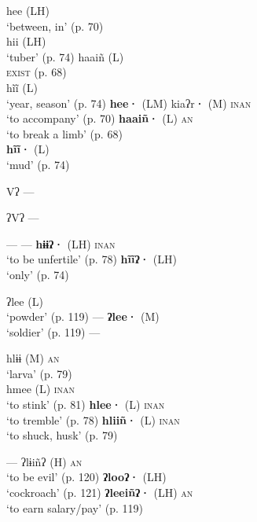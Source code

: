 \documentclass[output=paper]{langscibook}
\begin{document}
\ea
{}
     {hee (LH) \\
          \glt ‘between, in’ (p. 70)\\
     hii (LH) \\
          \glt ‘tuber’ (p. 74)
     }
     {haaiñ (L) \\
          \textsc{exist} (p. 68) \\
     hĩĩ (L) \\
          \glt ‘year, season’ (p. 74)
     }
     {\textbf{hee·} (LM) kiaʔr{\textbf{·}} (M) \textsc{inan} \\
               \glt ‘to accompany’ (p. 70)
     }
     {\textbf{haaiñ·} (L) \textsc{an}\\
               \glt ‘to break a limb’ (p. 68)\\
     \textbf{hĩĩ·} (L)\\
               \glt ‘mud’ (p. 74)\\
     }
\z

\ea Vʔ      ---
\z

\ea ʔVʔ     ---
\z

\ea
{}
     {---}
     {---}
     {\textbf{hɨɨʔ·} (LH) \textsc{inan} \\
          \glt ‘to be unfertile’ (p. 78)
     }
     {\textbf{hĩĩʔ·} (LH)\\
          \glt ‘only’ (p. 74)
     }
\z


\ea
{}
     {ʔlee (L)\\
               \glt ‘powder’ (p. 119)
     }
     {---}
     {\textbf{ʔlee·} (M)\\
          \glt ‘soldier’ (p. 119)
     }
     {---}
\z

\ea
{}
     {hlɨɨ (M) \textsc{an}\\
          ‘larva’ (p. 79)\\
     }
     {hmee (L) \textsc{inan} \\
          \glt ‘to stink’ (p. 81)
     }
     {\textbf{hlee·} (L) \textsc{inan}\\
          \glt ‘to tremble’ (p. 78)
     }
     {\textbf{hliiñ·} (L) \textsc{inan}\\
          \glt ‘to shuck, husk’ (p. 79)
     }
\z

\ea
{}
     {---}
     {ʔlɨiñʔ (H) \textsc{an} \\
          \glt ‘to be evil’ (p. 120)
     }
     {\textbf{ʔlooʔ·} (LH)\\
          \glt ‘cockroach’  (p. 121)
     }
     {\textbf{ʔleeiñʔ·} (LH) \textsc{an}\\
          \glt ‘to earn salary/pay’  (p. 119)
     }
\z
\end{document}
